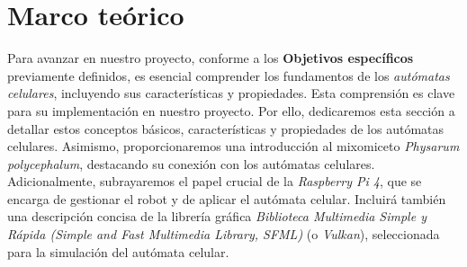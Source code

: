 \section{Marco te\'orico}
\label{sec:marco_teorico}
    Para avanzar en nuestro proyecto, conforme a los \textbf{Objetivos espec\'ificos} previamente definidos, 
        es esencial comprender los fundamentos de los \textit{aut\'omatas celulares}, incluyendo sus caracter\'isticas 
        y propiedades. Esta comprensi\'on es clave para su implementaci\'on en nuestro proyecto. Por ello, dedicaremos 
        esta secci\'on a detallar estos conceptos b\'asicos, caracter\'isticas y propiedades de los aut\'omatas celulares. 
        Asimismo, proporcionaremos una introducci\'on al mixomiceto \textit{Physarum polycephalum}, destacando su conexi\'on 
        con los aut\'omatas celulares.
    \vskip 0.5cm
    Adicionalmente, subrayaremos el papel crucial de la \textit{Raspberry Pi 4}, 
        que se encarga de gestionar el robot y de aplicar el aut\'omata celular. Incluir\'a 
        tambi\'en una descripci\'on concisa de la librer\'ia gr\'afica \textit{Biblioteca Multimedia Simple y R\'apida (Simple and Fast Multimedia Library, SFML)} (o \textit{Vulkan}), 
        seleccionada para la simulaci\'on del aut\'omata celular.

    
    
    
    
    
